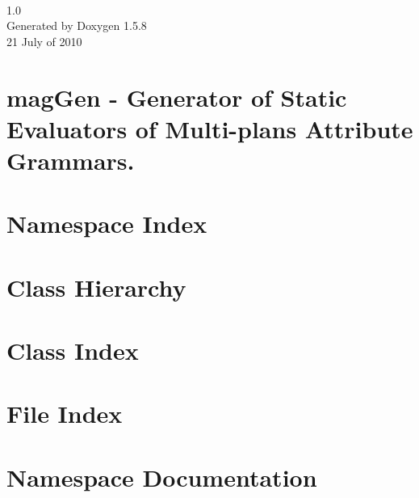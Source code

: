 \documentclass[a4paper,10pt]{book}
\begin{document}
\begin{titlepage}
\vspace*{7cm}
\begin{center}
{\Huge \textbf{\textit{}} \\[1ex]\large 1.0 }\\
\vspace*{1cm}
{\large Generated by Doxygen 1.5.8}\\
\vspace*{0.5cm}
{\small{21 July of 2010}}

\end{center}
\end{titlepage}
\clearemptydoublepage
{}
\tableofcontents
\clearemptydoublepage
{}
\chapter{magGen - Generator of Static Evaluators of Multi-plans Attribute Grammars.}
\label{index}\hypertarget{index}{}
\chapter{Namespace Index}

\chapter{Class Hierarchy}

\chapter{Class Index}

\chapter{File Index}

\chapter{Namespace Documentation}


\end{document}
